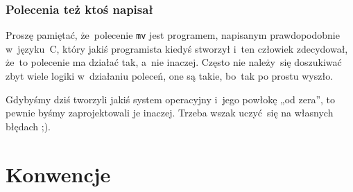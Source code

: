 \documentclass[10pt,t]{beamer}
\begin{document}
\begin{frame}
  \frametitle{Polecenia też ktoś napisał}





  Proszę pamiętać, że~polecenie \texttt{mv} jest programem, napisanym
  prawdopodobnie w~języku~C, który jakiś programista kiedyś stworzył i~ten
  człowiek zdecydował, że~to polecenie ma działać tak, a~nie inaczej.
  Często nie należy~się doszukiwać zbyt wiele logiki w~działaniu poleceń,
  one są takie, bo~tak po prostu wyszło.

  Gdybyśmy dziś tworzyli jakiś system operacyjny i~jego powłokę „od zera”,
  to pewnie byśmy zaprojektowali je inaczej. Trzeba wszak uczyć~się na
  własnych błędach ;).

\end{frame}










\section{Konwencje}
\end{document}
